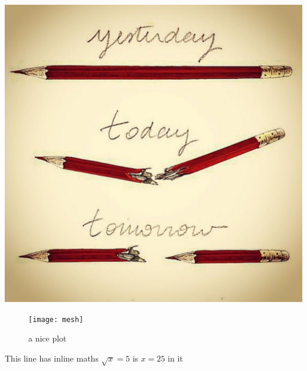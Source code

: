 \documentclass{article}
\begin{document}
\includegraphics{test-image}


\begin{figure}[h]
    \centering
    \texttt{[image: mesh]}
    \caption{a nice plot}
    \label{fig:mesh1}
\end{figure}


This line has inline maths $\sqrt{x} = 5$ is $x=25$ in it
\end{document}
